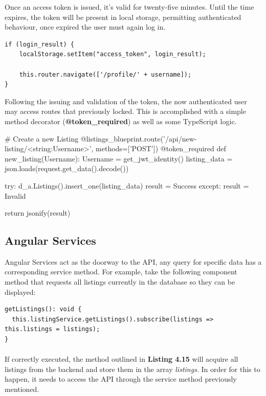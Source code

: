 Once an access token is issued, it's valid for twenty-five minutes. Until the time expires, the token will be present in local storage, permitting authenticated behaviour, once expired the user must again log in.

\begin{lstlisting}[caption=Storing the Authentication Token]
if (login_result) {
    localStorage.setItem("access_token", login_result);
    
    this.router.navigate(['/profile/' + username]);
}
\end{lstlisting}

Following the issuing and validation of the token, the now authenticated user may access routes that previously locked. This is accomplished with a simple method decorator (\textbf{@token\_required}) as well as some TypeScript logic. \newline

\begin{python}[caption=Method with Token Annotation]
# Create a new Listing
@listings_blueprint.route('/api/new-listing/<string:Username>', methods=['POST'])
@token_required
def new_listing(Username):
    Username = get_jwt_identity()
    listing_data = json.loads(request.get_data().decode())
   
    try: 
        d_a.Listings().insert_one(listing_data) 
        result = Success
    except:
        result = Invalid
    
    return jsonify(result)
\end{python}

\subsection{Angular Services}
Angular Services act as the doorway to the API, any query for specific data has a corresponding service method. For example, take the following component method that requests all listings currently in the database so they can be displayed:

\begin{lstlisting}[caption=Method for Acquiring all Listings]
getListings(): void {
  this.listingService.getListings().subscribe(listings => this.listings = listings);
}
\end{lstlisting}

\paragraph{}
If correctly executed, the method outlined in \textbf{Listing 4.15} will acquire all listings from the backend and store them in the array \textit{listings}. In order for this to happen, it needs to access the API through the service method previously mentioned. \newline

